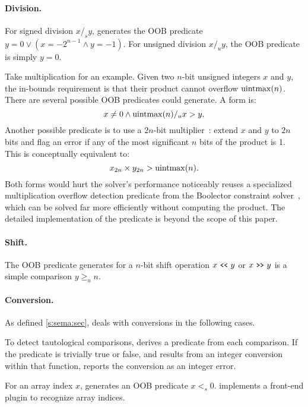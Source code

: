 \paragraph{Division.}
For signed division $x /_s y$, \sys generates the OOB predicate
$y = 0 \lor (x = -2^{n-1} \land y = -1)$.
For unsigned division $x /_u y$, the OOB predicate is simply
$y = 0$.

Take multiplication for an example.  Given two $n$-bit unsigned
integers $x$ and $y$, the in-bounds requirement is that their product
cannot overflow $\operatorname{uintmax}(n)$.  There are several possible OOB
predicates \sys could generate.
A \naive form is:
\begin{equation*}
x \neq 0 \land \operatorname{uintmax}(n) /_u x > y.
\end{equation*}
Another possible predicate is to use a $2n$-bit
multiplier~\cite{molnar:catchconv}: extend $x$ and $y$ to $2n$ bits
and flag an error if any of the most significant $n$ bits of the
product is 1.  This is conceptually equivalent to:
\begin{equation*}
x_{2n} \times y_{2n} > \operatorname{uintmax}(n).
\end{equation*}
Both forms would hurt the solver's performance noticeably
%
\sys reuses a specialized multiplication overflow detection predicate
from the Boolector constraint
solver~\cite[\chapterautorefname~3.5]{brummayer:phd}, which can be
solved far more efficiently without computing the product.  The
detailed implementation of the predicate is beyond the scope of
this paper.
\fi

\paragraph{Shift.}
The OOB predicate \sys generates for a $n$-bit shift operation
$x \shl y$ or $x \shr y$ is a simple comparison $y \geq_u n$.

\paragraph{Conversion.}
As defined \autoref{s:sema:sec}, \sys deals with conversions
in the following cases.

To detect tautological comparisons, \sys derives a predicate from
each comparison.  If the predicate is trivially true or false,
and results from an integer conversion within that function, \sys
reports the conversion as an integer error.

For an array index $x$, \sys generates an OOB predicate $x <_s 0$.
\sys implements a front-end plugin to recognize array indices.

